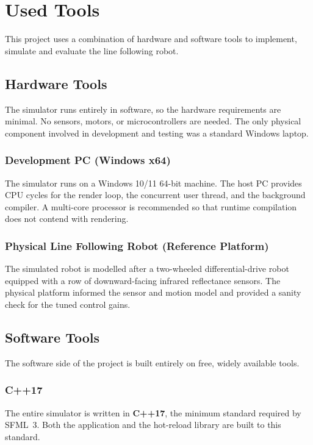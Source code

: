 \section{Used Tools}
This project uses a combination of hardware and software tools to implement, simulate and evaluate the line following robot.

\subsection{Hardware Tools}
The simulator runs entirely in software, so the hardware requirements are minimal. No sensors, motors, or microcontrollers are needed. The only physical component involved in development and testing was a standard Windows laptop.

\subsubsection{Development PC (Windows x64)}
The simulator runs on a Windows 10/11 64-bit machine. The host PC provides CPU cycles for the render loop, the concurrent user thread, and the background compiler. A multi-core processor is recommended so that runtime compilation does not contend with rendering.

\subsubsection{Physical Line Following Robot (Reference Platform)}
The simulated robot is modelled after a two-wheeled differential-drive robot equipped with a row of downward-facing infrared reflectance sensors. The physical platform informed the sensor and motion model and provided a sanity check for the tuned control gains.

\subsection{Software Tools}
The software side of the project is built entirely on free, widely available tools.

\subsubsection{C++17}
The entire simulator is written in \textbf{C++17}, the minimum standard required by SFML~3. Both the application and the hot-reload library are built to this standard.


